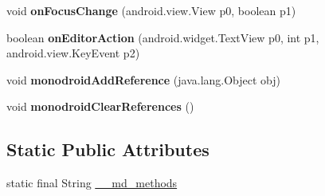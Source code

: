 \begin{DoxyCompactItemize}
void {\bfseries on\+Focus\+Change} (android.\+view.\+View p0, boolean p1)
\item 
\mbox{\label{classmd5b60ffeb829f638581ab2bb9b1a7f4f3f_1_1EntryCellView_a32acde16da027f419d2b0456f5bc4ada}} 
boolean {\bfseries on\+Editor\+Action} (android.\+widget.\+Text\+View p0, int p1, android.\+view.\+Key\+Event p2)
\item 
\mbox{\label{classmd5b60ffeb829f638581ab2bb9b1a7f4f3f_1_1EntryCellView_a8aa0a5d92b90e3037d35cce81ecf8b6b}} 
void {\bfseries monodroid\+Add\+Reference} (java.\+lang.\+Object obj)
\item 
\mbox{\label{classmd5b60ffeb829f638581ab2bb9b1a7f4f3f_1_1EntryCellView_a8bc0e236db435f7673b1350dca4cb844}} 
void {\bfseries monodroid\+Clear\+References} ()
\end{DoxyCompactItemize}
\subsection*{Static Public Attributes}
\begin{DoxyCompactItemize}
\item 
static final String \hyperlink{classmd5b60ffeb829f638581ab2bb9b1a7f4f3f_1_1EntryCellView_a58b79ef4732c97fcac8b0839aabf25e6}{\+\_\+\+\_\+md\+\_\+methods}
\end{DoxyCompactItemize}
